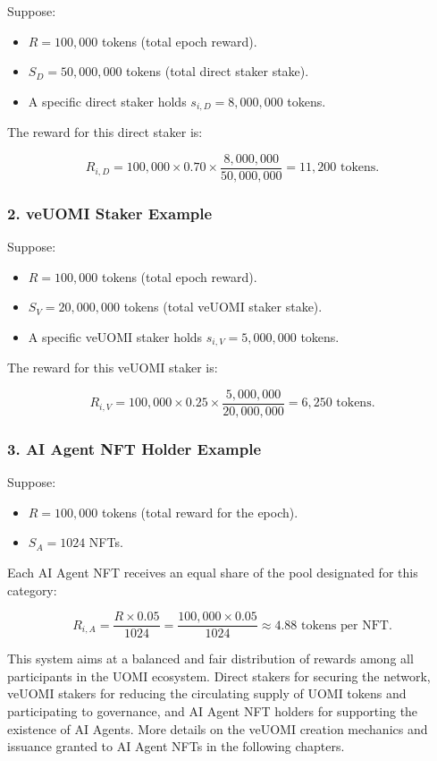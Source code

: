 \documentclass{article}
\begin{document}
Suppose:
\begin{itemize}
    \item \( R = 100,000 \) tokens (total epoch reward).
    \item \( S_D = 50,000,000 \) tokens (total direct staker stake).
    \item A specific direct staker holds \( s_{i,D} = 8,000,000 \) tokens.
\end{itemize}

The reward for this direct staker is:

\[
R_{i,D} = 100,000 \times 0.70 \times \frac{8,000,000}{50,000,000} = 11,200 \text{ tokens.}
\]

\subsubsection*{2. veUOMI Staker Example}

Suppose:
\begin{itemize}
    \item \( R = 100,000 \) tokens (total epoch reward).
    \item \( S_V = 20,000,000 \) tokens (total veUOMI staker stake).
    \item A specific veUOMI staker holds \( s_{i,V} = 5,000,000 \) tokens.
\end{itemize}

The reward for this veUOMI staker is:

\[
R_{i,V} = 100,000 \times 0.25 \times \frac{5,000,000}{20,000,000} = 6,250 \text{ tokens.}
\]

\subsubsection*{3. AI Agent NFT Holder Example}

Suppose:
\begin{itemize}
    \item \( R = 100,000 \) tokens (total reward for the epoch).
    \item \( S_A = 1024 \) NFTs.
\end{itemize}

Each AI Agent NFT receives an equal share of the pool designated for this category:

\[
R_{i,A} = \frac{R \times 0.05}{1024} = \frac{100,000 \times 0.05}{1024} \approx 4.88 \text{ tokens per NFT.}
\]


This system aims at a balanced and fair distribution of rewards among all participants in the UOMI ecosystem. Direct stakers for securing the network, veUOMI stakers for reducing the circulating supply of UOMI tokens and participating to governance, and AI Agent NFT holders for supporting the existence of AI Agents. More details on the veUOMI creation mechanics and issuance granted to AI Agent NFTs in the following chapters.
\end{document}
